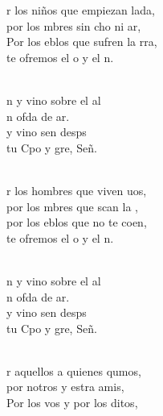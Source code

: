 \documentclass[12pt]{article}
\begin{document}
\begin{multicols*}{2}
\begin{cancion}%
	r los niños que empiezan lada,\\
	por los mbres sin cho ni ar,\\
	Por los eblos que sufren la rra,\\
	te ofremos el o y el n. \\\jump\\
	\begin{chorus}%
	n y vino sobre el al\\
	n ofda de ar.\\
	 y vino sen desps \\
	tu Cpo y gre, Señ. \\
	\end{chorus}%
	\jump\\
	r los hombres que viven uos,\\
	por los mbres que scan la ,\\
	por los eblos que no te coen,\\
	te ofremos el o y el n. \\\jump\\
	\begin{chorus}%
	n y vino sobre el al\\
	n ofda de ar.\\
	 y vino sen desps \\
	tu Cpo y gre, Señ. \\
	\end{chorus}%
	\jump\\
	r aquellos a quienes qumos,\\
	por notros y estra amis,\\
	Por los vos y por los ditos,\\

\end{cancion}
\end{multicols*}
\end{document}
